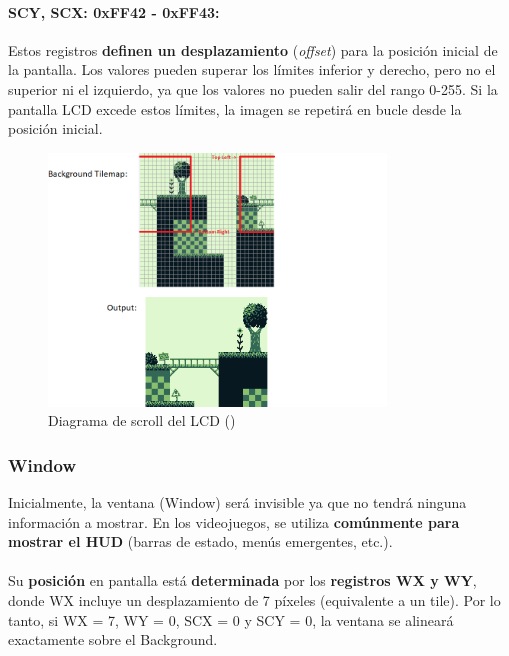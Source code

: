 \paragraph{SCY, SCX: 0xFF42 - 0xFF43:} Estos registros \textbf{definen un desplazamiento} (\textit{offset}) para la posición inicial de la pantalla. Los valores pueden superar los límites inferior y derecho, pero no el superior ni el izquierdo, ya que los valores no pueden salir del rango 0-255. Si la pantalla LCD excede estos límites, la imagen se repetirá en bucle desde la posición inicial.

\begin{figure}[H]
    \centering
    \includegraphics[width=0.8\textwidth]{include/images/scrolling_diagram.png}
    \caption{Diagrama de scroll del LCD (\cite{newpandocs})}
    \label{figure:bg_scroll}
\end{figure}

\subsubsection{Window}

Inicialmente, la ventana (Window) será invisible ya que no tendrá ninguna información a mostrar. En los videojuegos, se utiliza \textbf{comúnmente para mostrar el HUD} (barras de estado, menús emergentes, etc.).
\\\\
Su \textbf{posición} en pantalla está \textbf{determinada} por los \textbf{registros WX y WY}, donde WX incluye un desplazamiento de 7 píxeles (equivalente a un tile). Por lo tanto, si WX = 7, WY = 0, SCX = 0 y SCY = 0, la ventana se alineará exactamente sobre el Background.

